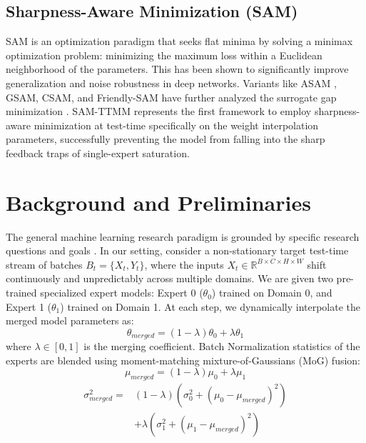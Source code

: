\documentclass{article}
\theoremstyle{plain}
\theoremstyle{definition}
\theoremstyle{remark}
\begin{document}
\subsection{Sharpness-Aware Minimization (SAM)}
SAM \cite{foret2020sharpness} is an optimization paradigm that seeks flat minima by solving a minimax optimization problem: minimizing the maximum loss within a Euclidean neighborhood of the parameters. This has been shown to significantly improve generalization and noise robustness in deep networks. Variants like ASAM \cite{kwon2021asam}, GSAM, CSAM, and Friendly-SAM have further analyzed the surrogate gap minimization \cite{zhuang2022surrogate, andriushchenko2022towards, du2022efficient}. SAM-TTMM \cite{anonymous2026c} represents the first framework to employ sharpness-aware minimization at test-time specifically on the weight interpolation parameters, successfully preventing the model from falling into the sharp feedback traps of single-expert saturation.

\section{Background and Preliminaries}
\label{submission-preliminaries}

The general machine learning research paradigm is grounded by specific research questions and goals \cite{langley00, mitchell80, kearns89, MachineLearningI, DudaHart2nd, Newell81, Samuel59}. In our setting, consider a non-stationary target test-time stream of batches $B_t = \{X_t, Y_t\}$, where the inputs $X_t \in \mathbb{R}^{B \times C \times H \times W}$ shift continuously and unpredictably across multiple domains. We are given two pre-trained specialized expert models: Expert 0 ($\theta_0$) trained on Domain 0, and Expert 1 ($\theta_1$) trained on Domain 1. At each step, we dynamically interpolate the merged model parameters as:
\begin{equation}
  \theta_{merged} = (1 - \lambda)\theta_0 + \lambda\theta_1
\end{equation}
where $\lambda \in [0, 1]$ is the merging coefficient. Batch Normalization statistics of the experts are blended using moment-matching mixture-of-Gaussians (MoG) fusion:
\begin{equation}
  \mu_{merged} = (1 - \lambda)\mu_0 + \lambda\mu_1
\end{equation}
\begin{align}
  \sigma^2_{merged} = & (1 - \lambda)(\sigma^2_0 + (\mu_0 - \mu_{merged})^2) \nonumber \\
                      & + \lambda(\sigma^2_1 + (\mu_1 - \mu_{merged})^2)
\end{align}
\end{document}
